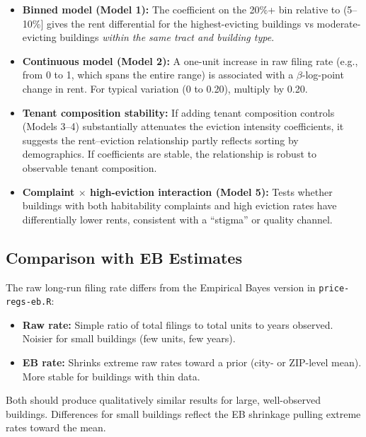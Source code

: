 \documentclass[
  11pt,
]{article}
\providecommand{\tightlist}{%
  \setlength{\itemsep}{0pt}\setlength{\parskip}{0pt}}
\begin{document}
\begin{itemize}
\tightlist
\item
  \textbf{Binned model (Model 1):} The coefficient on the 20\%+ bin
  relative to (5--10\%{]} gives the rent differential for the
  highest-evicting buildings vs moderate-evicting buildings \emph{within
  the same tract and building type}.
\item
  \textbf{Continuous model (Model 2):} A one-unit increase in raw filing
  rate (e.g., from 0 to 1, which spans the entire range) is associated
  with a \(\beta\)-log-point change in rent. For typical variation (0 to
  0.20), multiply by 0.20.
\item
  \textbf{Tenant composition stability:} If adding tenant composition
  controls (Models 3--4) substantially attenuates the eviction intensity
  coefficients, it suggests the rent--eviction relationship partly
  reflects sorting by demographics. If coefficients are stable, the
  relationship is robust to observable tenant composition.
\item
  \textbf{Complaint \(\times\) high-eviction interaction (Model 5):}
  Tests whether buildings with both habitability complaints and high
  eviction rates have differentially lower rents, consistent with a
  ``stigma'' or quality channel.
\end{itemize}

\subsection{Comparison with EB
Estimates}\label{comparison-with-eb-estimates}

The raw long-run filing rate differs from the Empirical Bayes version in
\texttt{price-regs-eb.R}:

\begin{itemize}
\tightlist
\item
  \textbf{Raw rate:} Simple ratio of total filings to total units to
  years observed. Noisier for small buildings (few units, few years).
\item
  \textbf{EB rate:} Shrinks extreme raw rates toward a prior (city- or
  ZIP-level mean). More stable for buildings with thin data.
\end{itemize}

Both should produce qualitatively similar results for large,
well-observed buildings. Differences for small buildings reflect the EB
shrinkage pulling extreme rates toward the mean.
\end{document}
